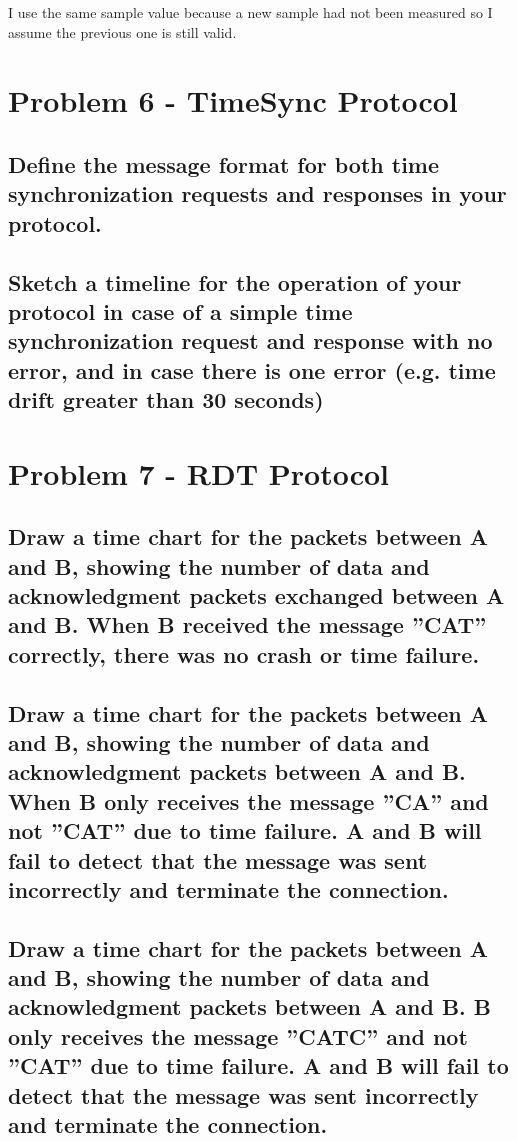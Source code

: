 \documentclass{article}
\begin{document}
	I use the same sample value because a new sample had not been measured so I assume the previous one is still valid.

\section{Problem 6 - TimeSync Protocol}

\subsection{Define the message format for both time synchronization requests and responses
in your protocol.}

\subsection{Sketch a timeline for the operation of your protocol in case of a simple time
synchronization request and response with no error, and in case there is one error (e.g.
time drift greater than 30 seconds)}

\section{Problem 7 - RDT Protocol}

\subsection{Draw a time chart for the packets between A and B, showing the number of
data and acknowledgment packets exchanged between A and B. When B received the
message ”CAT” correctly, there was no crash or time failure.}

\subsection{Draw a time chart for the packets between A and B, showing the number of
data and acknowledgment packets between A and B. When B only receives the message
”CA” and not ”CAT” due to time failure. A and B will fail to detect that the message
was sent incorrectly and terminate the connection.}

\subsection{Draw a time chart for the packets between A and B, showing the number of
data and acknowledgment packets between A and B. B only receives the message ”CATC”
and not ”CAT” due to time failure. A and B will fail to detect that the message was sent
incorrectly and terminate the connection.}
\end{document}
